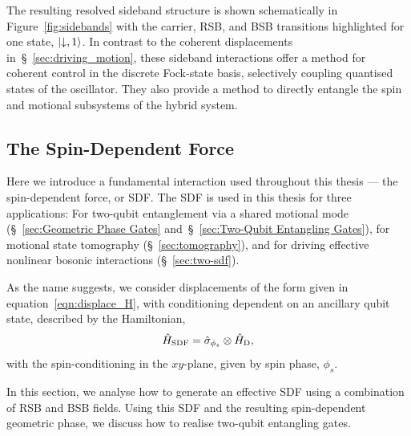 The resulting resolved sideband structure is shown schematically in
Figure~\ref{fig:sidebands} with the carrier, RSB, and BSB transitions
highlighted for one state, $\ket{\downarrow, 1}$. In contrast to the coherent
displacements in~\S~\ref{sec:driving_motion}, these sideband interactions offer
a method for coherent control in the discrete Fock-state basis, selectively
coupling quantised states of the oscillator.
They also provide a method to directly entangle the spin and motional subsystems of the hybrid system.


\subsection{The Spin-Dependent Force}
\label{sec:SDF}

Here we introduce a fundamental interaction used throughout this thesis --- the spin-dependent force, or SDF.
The SDF is used in this thesis for three applications: For two-qubit entanglement via a shared motional mode (\S~\ref{sec:Geometric Phase Gates} and~\S~\ref{sec:Two-Qubit Entangling Gates}), for motional state tomography (\S~\ref{sec:tomography}), and for driving effective nonlinear bosonic interactions (\S~\ref{sec:two-sdf}).

As the name suggests, we consider displacements of the form given in equation~\ref{eqn:displace_H}, with conditioning dependent on an ancillary qubit state, described by the Hamiltonian,
\begin{equation}
    \label{eqn:SDF}
    \hat H_{\rm SDF} = \hat\sigma_{\phi_s}\otimes\hat H_{\rm D},
\end{equation}
with the spin-conditioning in the $xy$-plane, given by spin phase, $\phi_s$.

In this section, we analyse how to generate an effective SDF using a combination of RSB and BSB fields.
Using this SDF and the resulting spin-dependent geometric phase, we discuss how to realise two-qubit entangling gates.\\

